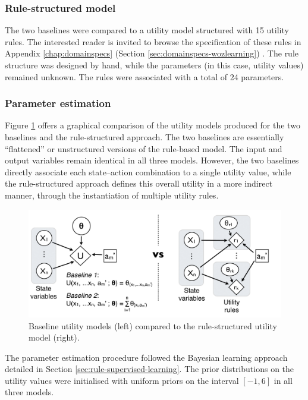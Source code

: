 \subsubsection*{Rule-structured model}
The two baselines were compared to a utility model structured with 15 utility rules. The interested reader is invited to browse the specification of these rules in Appendix \ref{chap:domainspecs} (Section \ref{sec:domainspecs-wozlearning}) . The rule structure was designed by hand, while the parameters (in this case, utility values) remained unknown. The rules were associated with a total of 24 parameters. 

\subsubsection*{Parameter estimation}

Figure \ref{fig:exp1_baselines} offers a graphical comparison of the utility models produced for the two baselines and the rule-structured approach.  The two baselines are essentially ``flattened'' or unstructured versions of the rule-based model.  The input and output variables remain identical in all three models. However, the two baselines directly associate each state--action combination to a single utility value, while the rule-structured approach defines this overall utility in a more indirect manner, through the instantiation of multiple utility rules. 

\begin{figure}[ht]
\centering
\includegraphics[scale=0.40]{imgs/exp1_baselines.pdf}
\caption{Baseline utility models (left) compared to the rule-structured utility model (right).}
\label{fig:exp1_baselines}
\end{figure}


The parameter estimation procedure followed the Bayesian learning approach detailed in Section \ref{sec:rule-supervised-learning}.  The prior distributions on the utility values were initialised with uniform priors on the interval $[-1,6]$ in all three models. 

